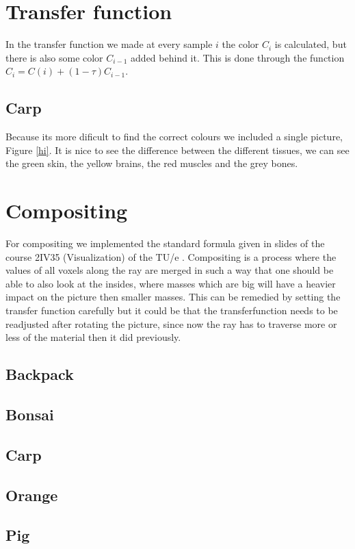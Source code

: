\documentclass[a4paper,twoside,11pt]{article}
\begin{document}
\section{Transfer function}
In the transfer function we made at every sample $i$ the color $C_i$ is calculated, but there is also some color $C_{i-1}$ added behind it. This is done through the function $C_i = C(i)+ (1-\tau)C_{i-1}$.
 \subsection{Carp}
 Because its more dificult to find the correct colours we included a single picture, Figure \ref{hi}. It is nice to see the difference between the different tissues, we can see the green skin, the yellow brains, the red muscles and the grey bones.
 
 \section{Compositing}
 For compositing we implemented the standard formula given in slides of the course 2IV35 (Visualization) of the TU/e \cite{slideVis_m}. Compositing is a process where the values of all voxels along the ray are merged in such a way that one should be able to also look at the insides, where masses which are big will have a heavier impact on the picture then smaller masses. This can be remedied by setting the transfer function carefully but it could be that the transferfunction needs to be readjusted after rotating the picture, since now the ray has to traverse more or less of the material then it did previously.
 
 \subsection{Backpack}
 
 \subsection{Bonsai}
 
 \subsection{Carp}
 
 \subsection{Orange}
 
 \subsection{Pig}
 
\end{document}

